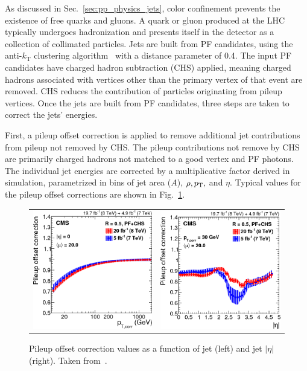 As discussed in Sec.~\ref{sec:pp_physics_jets}, color confinement prevents the existence of free quarks and gluons.
A quark or gluon produced at the LHC typically undergoes hadronization and presents itself in the detector as a collection of collimated particles.
Jets are built from PF candidates, using the anti-$k_{\text{T}}$ clustering algorithm~\cite{Cacciari:2008gp,Cacciari:2011ma} with a distance parameter of 0.4.
The input PF candidates have charged hadron subtraction (CHS) applied, meaning charged hadrons associated with vertices other than the primary vertex of that event are removed.
CHS reduces the contribution of particles originating from pileup vertices.
Once the jets are built from PF candidates, three steps are taken to correct the jets' energies.

First, a pileup offset correction is applied to remove additional jet contributions from pileup not removed by CHS.
The pileup contributions not remove by CHS are primarily charged hadrons not matched to a good vertex and PF photons.
The individual jet energies are corrected by a multiplicative factor derived in simulation, parametrized in bins of jet area ($A$), $\rho, p_{\mathrm{T}},$ and $\eta$.
Typical values for the pileup offset corrections are shown in Fig.~\ref{fig:evt_jet_pu_corrections}.
\begin{figure} [h!]
    \centering
    \begin{tabular}{c c}
        \includegraphics[width=0.48\linewidth]{figures/event_reconstruction_and_selection/jetmet8Tev_Figure_009-c.png} &
        \includegraphics[width=0.48\linewidth]{figures/event_reconstruction_and_selection/jetmet8Tev_Figure_009-d.png}
    \end{tabular}
    \caption{Pileup offset correction values as a function of jet \pT (left) and jet $|\eta|$ (right). Taken from~\cite{Khachatryan_2017_jets}.}
    \label{fig:evt_jet_pu_corrections}
\end{figure}

